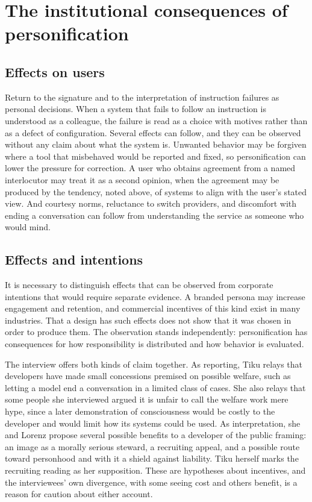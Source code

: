 \documentclass[11pt]{article}
\begin{document}
\section{The institutional consequences of personification}

\subsection{Effects on users}

Return to the signature and to the interpretation of instruction failures as personal decisions. When a system that fails to follow an instruction is understood as a colleague, the failure is read as a choice with motives rather than as a defect of configuration. Several effects can follow, and they can be observed without any claim about what the system is. Unwanted behavior may be forgiven where a tool that misbehaved would be reported and fixed, so personification can lower the pressure for correction. A user who obtains agreement from a named interlocutor may treat it as a second opinion, when the agreement may be produced by the tendency, noted above, of systems to align with the user's stated view. And courtesy norms, reluctance to switch providers, and discomfort with ending a conversation can follow from understanding the service as someone who would mind.

\subsection{Effects and intentions}

It is necessary to distinguish effects that can be observed from corporate intentions that would require separate evidence. A branded persona may increase engagement and retention, and commercial incentives of this kind exist in many industries. That a design has such effects does not show that it was chosen in order to produce them. The observation stands independently: personification has consequences for how responsibility is distributed and how behavior is evaluated.

The interview offers both kinds of claim together. As reporting, Tiku relays that developers have made small concessions premised on possible welfare, such as letting a model end a conversation in a limited class of cases. She also relays that some people she interviewed argued it is unfair to call the welfare work mere hype, since a later demonstration of consciousness would be costly to the developer and would limit how its systems could be used. As interpretation, she and Lorenz propose several possible benefits to a developer of the public framing: an image as a morally serious steward, a recruiting appeal, and a possible route toward personhood and with it a shield against liability. Tiku herself marks the recruiting reading as her supposition. These are hypotheses about incentives, and the interviewees' own divergence, with some seeing cost and others benefit, is a reason for caution about either account.
\end{document}
